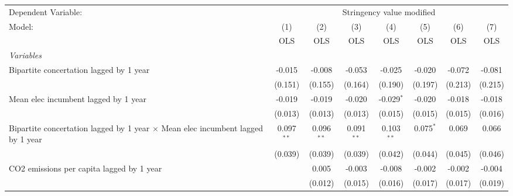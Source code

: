 
\begingroup
\centering
\begin{tabular}{lccccccc}
   \toprule
   Dependent Variable: & \multicolumn{7}{c}{Stringency value modified}\\
   Model:                                                                                 & (1)          & (2)          & (3)          & (4)          & (5)          & (6)          & (7)\\  
                                                                                          &  OLS         & OLS          & OLS          & OLS          & OLS          & OLS          & OLS\\  
   \midrule
   \emph{Variables}\\
   Bipartite concertation lagged by 1 year                                                & -0.015       & -0.008       & -0.053       & -0.025       & -0.020       & -0.072       & -0.081\\   
                                                                                          & (0.151)      & (0.155)      & (0.164)      & (0.190)      & (0.197)      & (0.213)      & (0.215)\\   
   Mean elec incumbent lagged by 1 year                                                   & -0.019       & -0.019       & -0.020       & -0.029$^{*}$ & -0.020       & -0.018       & -0.018\\   
                                                                                          & (0.013)      & (0.013)      & (0.013)      & (0.015)      & (0.015)      & (0.015)      & (0.016)\\   
   Bipartite concertation lagged by 1 year $\times$ Mean elec incumbent lagged by 1 year  & 0.097$^{**}$ & 0.096$^{**}$ & 0.091$^{**}$ & 0.103$^{**}$ & 0.075$^{*}$  & 0.069        & 0.066\\   
                                                                                          & (0.039)      & (0.039)      & (0.039)      & (0.042)      & (0.044)      & (0.045)      & (0.046)\\   
   CO2 emissions per capita lagged by 1 year                                              &              & 0.005        & -0.003       & -0.008       & -0.002       & -0.002       & -0.004\\   
                                                                                          &              & (0.012)      & (0.015)      & (0.016)      & (0.017)      & (0.017)      & (0.019)\\   

\end{tabular}
